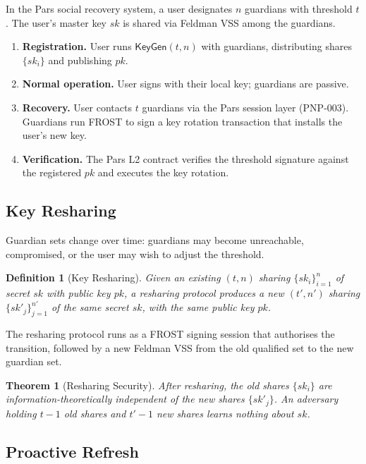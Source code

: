 \documentclass[11pt,a4paper]{article}
\newtheorem{definition}{Definition}[section]
\newtheorem{theorem}{Theorem}[section]
\begin{document}
In the Pars social recovery system, a user designates $n$ guardians
with threshold $t$.  The user's master key $sk$ is shared via Feldman
VSS among the guardians.

\begin{enumerate}
    \item \textbf{Registration.}  User runs $\mathsf{KeyGen}(t, n)$ with
    guardians, distributing shares $\{sk_i\}$ and publishing $pk$.
    \item \textbf{Normal operation.}  User signs with their local key;
    guardians are passive.
    \item \textbf{Recovery.}  User contacts $t$ guardians via the Pars
    session layer (PNP-003).  Guardians run FROST to sign a key rotation
    transaction that installs the user's new key.
    \item \textbf{Verification.}  The Pars L2 contract verifies the
    threshold signature against the registered $pk$ and executes the
    key rotation.
\end{enumerate}

\subsection{Key Resharing}

Guardian sets change over time: guardians may become unreachable,
compromised, or the user may wish to adjust the threshold.

\begin{definition}[Key Resharing]
    Given an existing $(t, n)$ sharing $\{sk_i\}_{i=1}^n$ of secret $sk$
    with public key $pk$, a resharing protocol produces a new
    $(t', n')$ sharing $\{sk'_j\}_{j=1}^{n'}$ of the \emph{same} secret
    $sk$, with the same public key $pk$.
\end{definition}

The resharing protocol runs as a FROST signing session that authorises
the transition, followed by a new Feldman VSS from the old qualified
set to the new guardian set.

\begin{theorem}[Resharing Security]
    After resharing, the old shares $\{sk_i\}$ are information-theoretically
    independent of the new shares $\{sk'_j\}$.  An adversary holding
    $t-1$ old shares and $t'-1$ new shares learns nothing about $sk$.
\end{theorem}

\subsection{Proactive Refresh}
\end{document}
